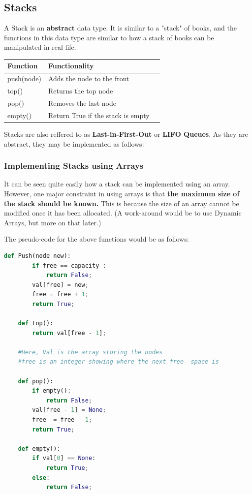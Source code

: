 \documentclass{article}
\theoremstyle{definition}
\theoremstyle{example}
\begin{document}
\subsection{\Large Stacks}
\hspace{4mm} A Stack is an \textbf{abstract} data type. It is similar to a "stack" of books, and the functions in this data type are similar to how a stack of books can be manipulated in real life.\par

\begin{center}
 \begin{tabular}{| m{9em} | m{15em} | m{4.5em} |} 
 \hline
 \textbf{Function} & \textbf{Functionality} \\ [0.5ex] 
 \hline
 push(node) & Adds the node to the front \\ 
 \hline
 top() & Returns the top node\\
 \hline
 pop() & Removes the last node\\
 \hline
 empty() & Return True if the stack is empty\\
 \hline
 \end{tabular}
\end{center}

Stacks are also reffered to as \textbf{Last-in-First-Out} or \textbf{LIFO Queues}. As they are abstract, they may be implemented as follows:

\subsubsection{\Large Implementing Stacks using Arrays}
\hspace{4mm} It can be seen quite easily how a stack can be implemented using an array. However, one major constraint in using arrays is that \textbf{the maximum size of the stack should be known.} This is because the size of an array cannot be modified once it has been allocated. (A work-around would be to use Dynamic Arrays, but more on that later.)\par
\vspace{4mm}
The pseudo-code for the above functions would be as follows:
\vspace{2mm}
\begin{lstlisting}[basicstyle = \Large, language = python]
    def Push(node new):
        if free == capacity : 
            return False;
        val[free] = new;
        free = free + 1;
        return True;
    
    def top():
        return val[free - 1];
        
    #Here, Val is the array storing the nodes
    #free is an integer showing where the next free  space is
    
    def pop():
        if empty():
            return False;
        val[free - 1] = None;
        free  = free - 1;
        return True;
    
    def empty():
        if val[0] == None:
            return True;
        else:
            return False;
        
\end{lstlisting}
    
\end{document}
